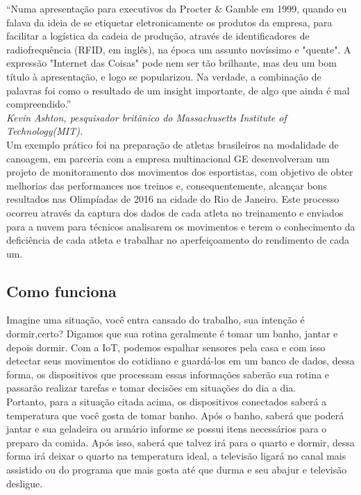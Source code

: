 \documentclass[11pt]{classe_cn}                 %
\begin{document}
“Numa apresentação para executivos da Procter & Gamble em 1999, quando eu 
falava da ideia de se etiquetar eletronicamente os produtos da empresa, 
para facilitar a logística da cadeia de produção, através de identificadores 
de radiofrequência (RFID, em inglês), na época um assunto novíssimo e "quente". 
A expressão "Internet das Coisas" pode nem ser tão brilhante, mas deu um bom 
título à apresentação, e logo se popularizou. Na verdade, a combinação de 
palavras foi como o resultado de um insight importante, de algo que ainda 
é mal compreendido.”\\

\textit{Kevin Ashton, pesquisador britânico do Massachusetts Institute of Technology(MIT).}\\

Um exemplo prático foi na preparação de atletas brasileiros na modalidade de canoagem, 
em parceria com a empresa multinacional GE desenvolveram um projeto de monitoramento 
dos movimentos dos esportistas, com objetivo de obter melhorias das performances nos 
treinos e, consequentemente, alcançar bons resultados nas Olimpíadas de 2016 na 
cidade do Rio de Janeiro. Este processo ocorreu através da captura dos dados de 
cada atleta no treinamento e enviados para a nuvem para técnicos analisarem os 
movimentos e terem o conhecimento da deficiência de cada atleta e trabalhar no 
aperfeiçoamento do rendimento de cada um.


\subsection{Como funciona}
Imagine uma situação, você entra cansado do trabalho, sua intenção 
é dormir,certo? Digamos que sua rotina geralmente é tomar um banho, 
jantar e depois dormir. Com a IoT, podemos espalhar sensores pela 
casa e com isso detectar seus movimentos do cotidiano e guardá-los 
em um banco de dados, dessa forma, os dispositivos que processam 
essas informações saberão sua rotina e passarão realizar tarefas 
e tomar decisões em situações do dia a dia.\\

Portanto, para a situação citada acima, os dispositivos conectados 
saberá a temperatura que você gosta de tomar banho. Após o banho, 
saberá que poderá jantar e sua geladeira ou armário informe se 
possui itens necessários para o preparo da comida. Após isso, 
saberá que talvez irá para o quarto e dormir, dessa forma irá 
deixar o quarto na temperatura ideal, a televisão ligará no canal 
mais assistido ou do programa que mais gosta até que durma e seu 
abajur e televisão desligue.\\
\end{document}
